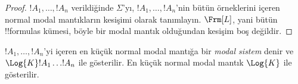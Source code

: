 \begin{proof}
  $!A_1,\dots,!A_n$ verildiğinde $\Sigma$'yı, $!A_1,\dots,!A_n$'nin bütün örneklerini
  içeren normal modal mantıkların kesişimi olarak tanımlayın.
  $\Frm[L]$, yani bütün !!{formula}s kümesi, böyle bir modal mantık olduğundan kesişim
  boş değildir.
\end{proof}

\begin{defn}
$!A_1,\dots,!A_n$'yi içeren en küçük normal modal mantığa bir
\emph{modal sistem} denir ve $\Log{K}!A_1\dots !A_n$ ile gösterilir. En
küçük normal modal mantık $\Log{K}$ ile gösterilir.
\end{defn}

